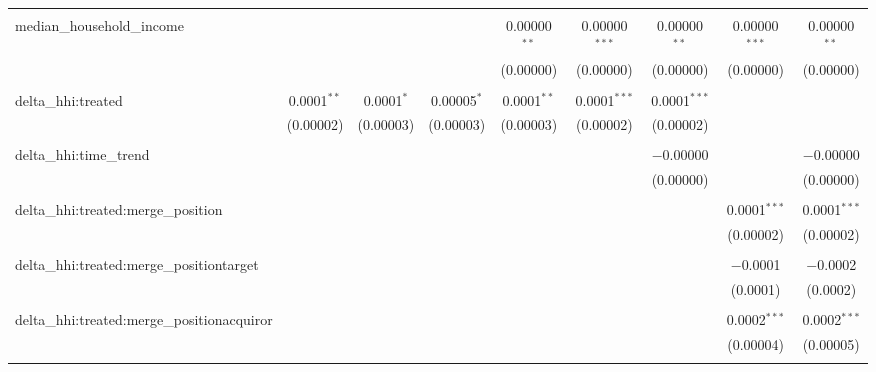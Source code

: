 \begin{table}[H]
{\begin{tabular}{@{\extracolsep{5pt}}lcccccccc}
   & & & & & & & & \\  

  median\_household\_income &  &  &  & 0.00000$^{**}$ & 0.00000$^{***}$ & 0.00000$^{**}$ & 0.00000$^{***}$ & 0.00000$^{**}$ \\  

   &  &  &  & (0.00000) & (0.00000) & (0.00000) & (0.00000) & (0.00000) \\  

   & & & & & & & & \\  

  delta\_hhi:treated & 0.0001$^{**}$ & 0.0001$^{*}$ & 0.00005$^{*}$ & 0.0001$^{**}$ & 0.0001$^{***}$ & 0.0001$^{***}$ &  &  \\  

   & (0.00002) & (0.00003) & (0.00003) & (0.00003) & (0.00002) & (0.00002) &  &  \\  

   & & & & & & & & \\  

  delta\_hhi:time\_trend &  &  &  &  &  & $-$0.00000 &  & $-$0.00000 \\  

   &  &  &  &  &  & (0.00000) &  & (0.00000) \\  

   & & & & & & & & \\  

  delta\_hhi:treated:merge\_position &  &  &  &  &  &  & 0.0001$^{***}$ & 0.0001$^{***}$ \\  

   &  &  &  &  &  &  & (0.00002) & (0.00002) \\  

   & & & & & & & & \\  

  delta\_hhi:treated:merge\_positiontarget &  &  &  &  &  &  & $-$0.0001 & $-$0.0002 \\  

   &  &  &  &  &  &  & (0.0001) & (0.0002) \\  

   & & & & & & & & \\  

  delta\_hhi:treated:merge\_positionacquiror &  &  &  &  &  &  & 0.0002$^{***}$ & 0.0002$^{***}$ \\  

   &  &  &  &  &  &  & (0.00004) & (0.00005) \\  

   & & & & & & & & \\  


\end{tabular}}
\end{table}
